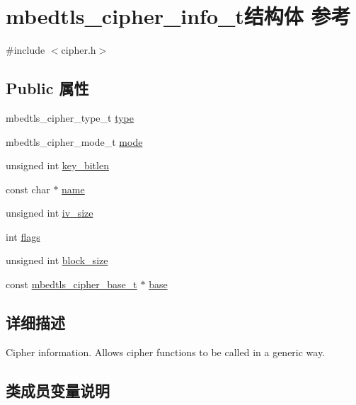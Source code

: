 \hypertarget{structmbedtls__cipher__info__t}{}\section{mbedtls\+\_\+cipher\+\_\+info\+\_\+t结构体 参考}
\label{structmbedtls__cipher__info__t}


{\ttfamily \#include $<$cipher.\+h$>$}

\subsection*{Public 属性}
\begin{DoxyCompactItemize}
\item 
mbedtls\+\_\+cipher\+\_\+type\+\_\+t \hyperlink{structmbedtls__cipher__info__t_a399f289efa81ca0da63bc80686b5fe82}{type}
\item 
mbedtls\+\_\+cipher\+\_\+mode\+\_\+t \hyperlink{structmbedtls__cipher__info__t_a6603375900f4834ae6c91e305aef34f6}{mode}
\item 
unsigned int \hyperlink{structmbedtls__cipher__info__t_a21ac3fc6bf536ce16f1754301e7fe3c9}{key\+\_\+bitlen}
\item 
const char $\ast$ \hyperlink{structmbedtls__cipher__info__t_a7e79a9fb2bd143cc08d59b89b86c9ed7}{name}
\item 
unsigned int \hyperlink{structmbedtls__cipher__info__t_a3416bc1e18e1694da17bc922f152b20d}{iv\+\_\+size}
\item 
int \hyperlink{structmbedtls__cipher__info__t_af0aa5e7fedfd8a85434ec43691d890d8}{flags}
\item 
unsigned int \hyperlink{structmbedtls__cipher__info__t_a7be9560c375110a1d829407e74ab698f}{block\+\_\+size}
\item 
const \hyperlink{structmbedtls__cipher__base__t}{mbedtls\+\_\+cipher\+\_\+base\+\_\+t} $\ast$ \hyperlink{structmbedtls__cipher__info__t_ab49e136926e04b02806503deb8844f2d}{base}
\end{DoxyCompactItemize}


\subsection{详细描述}
Cipher information. Allows cipher functions to be called in a generic way. 

\subsection{类成员变量说明}
\mbox{\label{structmbedtls__cipher__info__t_ab49e136926e04b02806503deb8844f2d}} 
